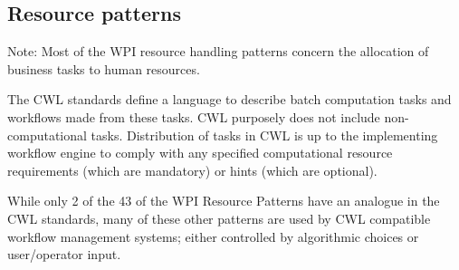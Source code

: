 \subsection{Resource patterns}

Note: Most of the WPI resource handling patterns concern the allocation of business tasks to human resources.

The CWL standards define a language to describe batch computation tasks and workflows made from these tasks. CWL purposely does not include non-computational tasks. Distribution of tasks in CWL is up to the implementing workflow engine to comply with any specified computational resource requirements (which are mandatory) or hints (which are optional).

While only 2 of the 43 of the WPI Resource Patterns have an analogue in the CWL standards, many of these other patterns are used by CWL compatible workflow management systems; either controlled by algorithmic choices or user/operator input.

